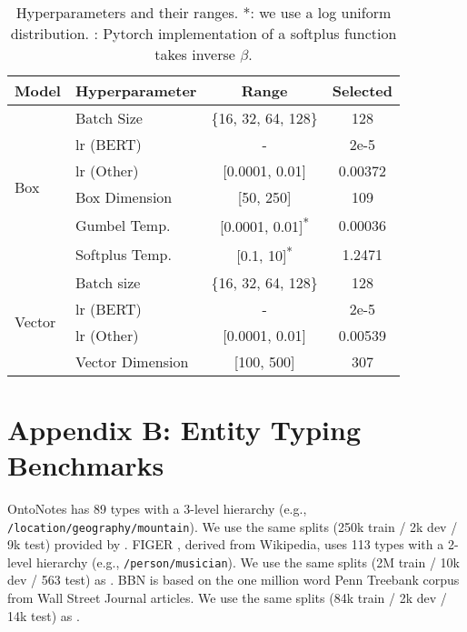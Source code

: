 \documentclass[11pt,a4paper]{article}
\begin{document}
\renewcommand{\arraystretch}{1}
\begin{table}[H]
	\centering
	\small
	\setlength{\tabcolsep}{4pt}
	\begin{tabular}{l l c c}
		\toprule
		\multicolumn{1}{c}{Model} & \multicolumn{1}{c}{Hyperparameter} & \multicolumn{1}{c}{Range} & \multicolumn{1}{c}{Selected}\\
		\midrule
		\multirow{6}{*}{Box} & Batch Size & \{16, 32, 64, 128\} & 128 \\
		& lr (BERT) & - & 2e-5 \\
		& lr (Other) & [0.0001, 0.01] &  0.00372 \\
		& Box Dimension & [50, 250] & 109 \\		
		& Gumbel Temp. & [0.0001, 0.01]\textsuperscript{*} & 0.00036 \\
		& Softplus Temp.\textsuperscript{\textdagger} & [0.1, 10]\textsuperscript{*} & 1.2471 \\
		\midrule
		\multirow{4}{*}{Vector} & Batch size & \{16, 32, 64, 128\} & 128 \\
		& lr (BERT) & - & 2e-5 \\
		& lr (Other) & [0.0001, 0.01] & 0.00539  \\
		& Vector Dimension & [100, 500] & 307 \\
		\bottomrule
	\end{tabular}

	\caption{Hyperparameters and their ranges. *: we use a log uniform distribution. \textdagger: Pytorch implementation of a softplus function takes inverse $\beta$. }
	\label{tab:hyperparams}
\end{table}



\section*{Appendix B: Entity Typing Benchmarks}\label{app:typing_data}
OntoNotes \citep{Dan_Gillick_14} has 89 types with a 3-level hierarchy (e.g., {\tt /location/geography/mountain}). We use the same splits (250k train / 2k dev / 9k test) provided by \citep{sonse_shimaoka_17}. FIGER \citep{Xiao_Ling_12}, derived from Wikipedia, uses 113 types with a 2-level hierarchy (e.g., {\tt /person/musician}). We use the same splits (2M train / 10k dev / 563 test) as \citep{sonse_shimaoka_17}. BBN \citep{bbn} is based on the one million word Penn Treebank corpus from Wall Street Journal articles. We use the same splits (84k train / 2k dev / 14k test) as \citet{Xiang_Ren_16b, Tongfei_Chen_20}.
\end{document}
